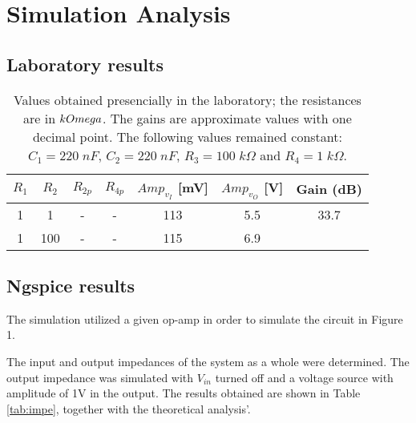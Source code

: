 \section{Simulation Analysis} \label{sec:simulation}

\subsection{Laboratory results} \label{subsec:laboratory_results}

\begin{table}[H]
    \centering
    \begin{tabular}{|c|c|c|c|c|c|c|}
        \hline
        $R_1$ & $R_2$ & $R_{2p}$ & $R_{4p}$ & $Amp_{v_I}$ [mV] & $Amp_{v_O}$ [V] & Gain (dB)\\
        \hline
        1 & 1 & - & - & 113 & 5.5 & 33.7 \\
        1 & 100 & - & - & 115 & 6.9 & \\
        \hline
    \end{tabular}
    \caption{Values obtained presencially in the laboratory; the resistances are in $k\;\\Omega$. The gains are approximate values with one decimal point. The following values remained constant: $C_1=220\;nF$, $C_2=220\;nF$, $R_3=100\;k\Omega$ and $R_4=1\;k\Omega$.}
    \label{tab:lab_results}
\end{table}

\subsection{Ngspice results} \label{subsec:ngspice_results}

The simulation utilized a given op-amp in order to simulate the circuit in Figure 1. 



The input and output impedances of the system as a whole were determined. The output impedance was simulated with $V_{in}$ turned off and a voltage source with amplitude of 1V in the output. The results obtained are shown in Table \ref{tab:impe}, together with the theoretical analysis'.

